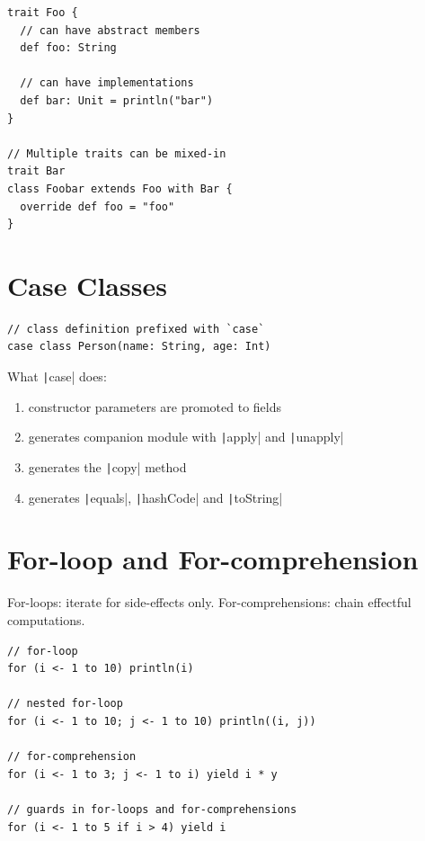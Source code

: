 \documentclass[10pt,landscape,a4paper]{article}
\begin{document}
\begin{multicols*}{4}
\begin{verbatim}
trait Foo {
  // can have abstract members
  def foo: String

  // can have implementations
  def bar: Unit = println("bar")
}

// Multiple traits can be mixed-in
trait Bar
class Foobar extends Foo with Bar {
  override def foo = "foo"
}
\end{verbatim}

  \section{Case Classes}

\begin{verbatim}
// class definition prefixed with `case`
case class Person(name: String, age: Int)
\end{verbatim}

  What \texttt|case| does:
  \begin{enumerate}
  \item constructor parameters are promoted to fields
  \item generates companion module with \texttt|apply| and \texttt|unapply|
  \item generates the \texttt|copy| method
  \item generates \texttt|equals|, \texttt|hashCode| and \texttt|toString|
  \end{enumerate}

  \section{For-loop and For-comprehension}

  \begin{mdframed}
    \footnotesize For-loops: iterate for side-effects only.
    For-comprehensions: chain effectful computations.
  \end{mdframed}

\begin{verbatim}
// for-loop
for (i <- 1 to 10) println(i)

// nested for-loop
for (i <- 1 to 10; j <- 1 to 10) println((i, j))

// for-comprehension
for (i <- 1 to 3; j <- 1 to i) yield i * y

// guards in for-loops and for-comprehensions
for (i <- 1 to 5 if i > 4) yield i


\end{verbatim}
\end{multicols*}
\end{document}
